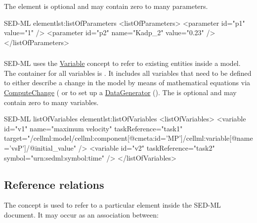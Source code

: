 The element is optional and may contain zero to many parameters.

\begin{myXmlLst}{SED-ML  element}{lst:listOfParameters}
<listOfParameters>
	<parameter id="p1" value="1" />
	<parameter id="p2" name="Kadp_2" value="0.23" />
</listOfParameters>
\end{myXmlLst}


\subsubsection{}
\label{sec:listOfVariables}
SED-ML uses the \hyperref[class:variable]{Variable} concept to refer to existing entities inside a model. The container for all variables is  . It includes all variables that need to be defined to either describe a change in the model by means of mathematical equations via \hyperref[class:computeChange]{ComputeChange} ( or to set up a \hyperref[class:dataGenerator]{DataGenerator} (). The  is optional and may contain zero to many variables. 

\begin{myXmlLst}{SED-ML listOfVariables element}{lst:listOfVariables}
<listOfVariables>
	<variable id="v1" name="maximum velocity" taskReference="task1" 
		target="/cellml:model/cellml:component[@cmeta:id='MP']/cellml:variable[@name='vsP']/@initial_value" />
	<variable id="v2" taskReference="task2" symbol="urn:sedml:symbol:time" />
</listOfVariables>
\end{myXmlLst}

\subsection{Reference relations}
\label{sec:reference}

The  concept is used to refer to a particular element inside the SED-ML document. It may occur as an association between:

